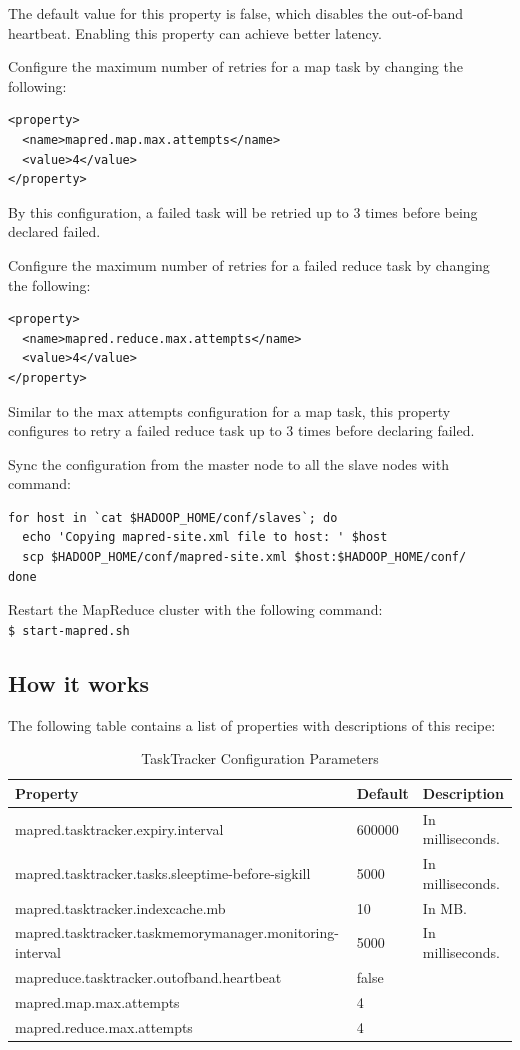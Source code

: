 The default value for this property is false, which disables the out-of-band heartbeat. Enabling this property can achieve better latency.


Configure the maximum number of retries for a map task by changing the following:
\lstset{style=bashstyle}
\begin{lstlisting}
<property>
  <name>mapred.map.max.attempts</name>
  <value>4</value>
</property>
\end{lstlisting}

By this configuration, a failed task will be retried up to 3 times before being declared failed.


Configure the maximum number of retries for a failed reduce task by changing the following:
\lstset{style=bashstyle}
\begin{lstlisting}
<property>
  <name>mapred.reduce.max.attempts</name>
  <value>4</value>
</property>
\end{lstlisting}
Similar to the max attempts configuration for a map task, this property configures to retry a failed reduce task up to 3 times before declaring failed.


Sync the configuration from the master node to all the slave nodes with command:
\lstset{style=bashstyle}
\begin{lstlisting}
for host in `cat $HADOOP_HOME/conf/slaves`; do
  echo 'Copying mapred-site.xml file to host: ' $host
  scp $HADOOP_HOME/conf/mapred-site.xml $host:$HADOOP_HOME/conf/
done
\end{lstlisting}


Restart the MapReduce cluster with the following command: \\
\verb|$ start-mapred.sh|

\subsection*{How it works}
The following table contains a list of properties with descriptions of this recipe: \\
\begin{table}[h]
  \centering
  \begin{tabular}{lll}
    \toprule
    \textbf{Property} & \textbf{Default} &  \textbf{Description}  \\ \midrule
      mapred.tasktracker.expiry.interval & 600000 & In milliseconds. \\
      mapred.tasktracker.tasks.sleeptime-before-sigkill & 5000 & In milliseconds. \\
      mapred.tasktracker.indexcache.mb & 10 & In MB. \\
      mapred.tasktracker.taskmemorymanager.monitoring-interval & 5000 & In milliseconds. \\
      mapreduce.tasktracker.outofband.heartbeat & false &  \\
      mapred.map.max.attempts & 4 & \\
      mapred.reduce.max.attempts & 4 &  \\ \bottomrule
  \end{tabular}
  \caption{TaskTracker Configuration Parameters}\label{tbl:tasktracker}
\end{table}

